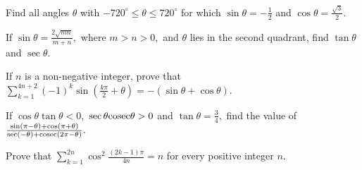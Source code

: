 \item Find all angles $\theta$ with $-720^\circ \leq \theta \leq 720^\circ$ for which $\sin\theta = -\frac{1}{2}$ and
  $\cos\theta = \frac{\sqrt{3}}{2}.$
\item If $\sin\theta = \frac{2\sqrt{mn}}{m + n},$ where $m > n > 0,$ and $\theta$ lies in the second quadrant, find $\tan\theta$
  and $\sec\theta.$
\item If $n$ is a non-negative integer, prove that $\sum_{k = 1}^{4n + 2}(-1)^k\sin\left(\frac{k\pi}{2} + \theta\right) =
  -(\sin\theta + \cos\theta).$
\item If $\cos\theta\tan\theta < 0,$ $\sec\theta{\rm cosec}\theta > 0$ and $\tan\theta = \frac{3}{4},$ find the value of
  $\frac{\sin(\pi - \theta) + \cos(\pi + \theta)}{\sec(-\theta) + {\rm cosec}(2\pi - \theta)}.$
\item Prove that $\sum_{k = 1}^{2n}\cos^2\frac{(2k - 1)\pi}{4n} = n$ for every positive integer $n.$
\stopitemize
